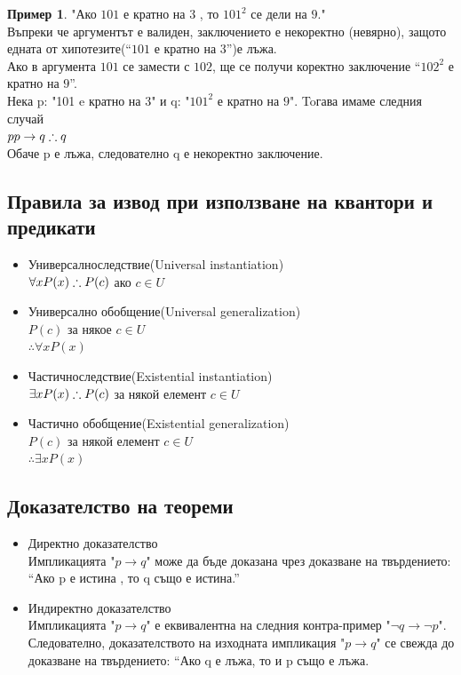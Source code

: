 \documentclass[fleqn, 12pt]{article}
\theoremstyle{definition}
\newtheorem{example}{Пример}[subsection]
\begin{document}
\begin{example}
"Ако $101$ е кратно на $3$ , то $101^2$ се дели на $9$." \\
Въпреки че аргументът е валиден, заключението е некоректно (невярно), защото едната от хипотезите(“$101$ е кратно на $3$”)е лъжа. \\
Ако в аргумента $101$ се замести с $102$, ще се получи коректно заключение “$102^2$ е кратно на $9$”.
\\ 
Нека p: "101 e кратно на 3" и q: "$101^2$ е кратно на $9$". Toгава имаме следния случай
\\
$p
\\ p \rightarrow q 
\\ \therefore q$
\\Обаче p е лъжа, следователно q е некоректно заключение. 
\end{example}

\subsection{Правила за извод при използване на квантори и предикати}

\begin{itemize}
	\item Универсалноследствие(Universal instantiation)
\\
$\forall x P(x) 
\\
\therefore P(c)$ ако $c \in U$
	\item Универсално обобщение(Universal generalization)
\\
$ P(c)$ за някое $c \in U$ 
\\
$\therefore\forall x P(x)$

	\item Частичноследствие(Existential instantiation)
\\
$\exists x P(x) 
\\
\therefore P(c)$ за някой елемент $c \in U$

	\item Частично обобщение(Existential generalization)
\\
$P(c)$ за някой елемент $c \in U$
\\
$\therefore \exists x P(x)  $
\end{itemize}

\subsection{Доказателство на теореми}
\begin{itemize}
	\item Директно доказателство \\
Импликацията "$p \rightarrow q$" може да бъде доказана чрез доказване на твърдението:\\
 “Ако p е истина , то q също е истина.”
	\item Индиректно доказателство \\
Импликацията "$p \rightarrow q$" е еквивалентна на следния контра-пример "$\neg q \rightarrow \neg p$". Следователно, доказателството на изходната импликация "$p \rightarrow q$" се свежда до доказване на твърдението: “Ако q е лъжа, то и p също е лъжа.
\end{itemize}
\end{document}
